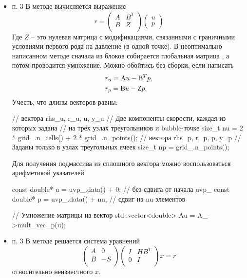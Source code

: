 \begin{itemize}
\item п. 3
В методе  вычисляется выражение
\begin{equation*}
r = 
\left(
\begin{matrix}
A & B^T\\
B & Z  \\
\end{matrix}
\right)
\left(
\begin{matrix}
u \\
p
\end{matrix}
\right)
\end{equation*}
Где $Z$ -- это нулевая матрица с модификациями, связанными с граничными условиями первого рода на давление (в одной точке).
В неоптимально написанном методе сначала из блоков собирается глобальная матрица ,
а потом проводится умножение.
Можно обойтись без сборки, если написать
\begin{align*}
&r_u = {\rm A} u  - {\rm B}^T p, \\
&r_p = {\rm B} u  - {\rm Z} p.
\end{align*}
Учесть, что длины векторов равны:
\begin{cppcode}
// вектора rhs_u, r_u, u, y_u
// Две компоненты скорости, каждая из которых задана
// на трёх узлах треугольников и bubble-точке
size_t nu = 2 * grid_.n_cells() + 2 * grid_.n_points();
// вектора rhs_p, r_p, p, y_p
// Заданы только в узлах треугольных ячеек
size_t np = grid_.n_points();
\end{cppcode}
Для получения подмассива из сплошного вектора можно воспользоваться арифметикой указателей
\begin{cppcode}
const double* u = uvp_.data() + 0;  // без сдвига от начала uvp_
const double* p = uvp_.data() + nu; // сдвиг на nu элементов

// Умножение матрицы на вектор
std::vector<double> Au = A_->mult_vec_p(u);
\end{cppcode}

\item п. 3
В методе  решается система уравнений
\begin{equation*}
\left(
\begin{matrix}
A & 0\\
B & -S  \\
\end{matrix}
\right)
\left(
\begin{matrix}
I & H B^T\\
0 & I  \\
\end{matrix}
\right)
x = r
\end{equation*}
относительно неизвестного $x$.


\end{itemize}

